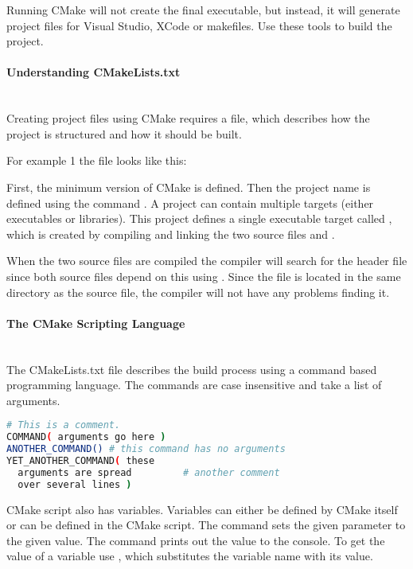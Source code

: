 \documentclass[11pt,a4paper,landscape]{scrartcl} %
\newcommand{\sectiontitle}[1]{\paragraph{#1} \ \\} %
\begin{document}
\begin{multicols}{2}
Running CMake will not create the final executable, but instead, it will generate project files for Visual Studio, XCode or makefiles. Use these tools to build the project.

\sectiontitle{Understanding CMakeLists.txt}

Creating project files using CMake requires a  file, which describes how the project is structured and how it should be built.

For example 1 the file looks like this: 



First, the minimum version of CMake is defined. Then the project name is defined using the command . A project can contain multiple targets (either executables or libraries). This project defines a single executable target called , which is created by compiling and linking the two source files  and .

When the two source files are compiled the compiler will search for the header file  since both source files depend on this using . Since the file is located in the same directory as the source file, the compiler will not have any problems finding it.

\sectiontitle{The CMake Scripting Language}

The CMakeLists.txt file describes the build process using a command based programming language. The commands are case insensitive and take a list of arguments.

\begin{lstlisting}[language=bash]
# This is a comment.
COMMAND( arguments go here )
ANOTHER_COMMAND() # this command has no arguments
YET_ANOTHER_COMMAND( these
  arguments are spread         # another comment 
  over several lines )
\end{lstlisting}

CMake script also has variables. Variables can either be defined by CMake itself or can be defined in the CMake script.  The command  sets the given parameter to the given value. The command  prints out the value to the console. To get the value of a variable use , which substitutes the variable name with its value.




\end{multicols}
\end{document}
